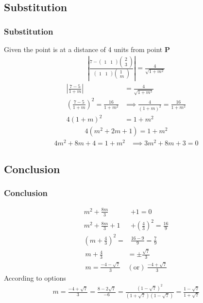 \documentclass{beamer}
\providecommand{\brak}[1]{\ensuremath{\left(#1\right)}}
\theoremstyle{remark}
\newcommand{\myvec}[1]{\ensuremath{\begin{pmatrix}#1\end{pmatrix}}}
\let\vec\mathbf
\numberwithin{equation}{section}
\begin{document}
\subsection{Substitution}
\begin{frame}
\frametitle{Substitution}
Given the point is at a distance of 4 units from point $\vec{P}$
\begin{align}
 \left|  \frac{7-\myvec{1&1}\myvec{2\\3}}{\myvec{1&1}\myvec{1\\m}} \right| =\frac{4}{\sqrt{1+m^2}} 
\end{align}
\begin{align}
\left|\frac{7-5}{1+m}\right|&=\frac{4}{\sqrt{1+m^2}} \\
\brak{\frac{7-5}{1+m}}^2=\frac{16}{1+m^2} &\implies \frac{4}{\brak{1+m}^2}=\frac{16}{1+m^2} \\
4\brak{1+m}^2&=1+m^2 
\end{align}
\begin{align}
4\brak{m^2+2m+1}=1+m^2 
\end{align}
\begin{align}
4m^2+8m+4=1+m^2 &\implies 3m^2 + 8m + 3 = 0 
\end{align}
\end{frame}
\subsection{Conclusion}
\begin{frame}
\frametitle{Conclusion}
\begin{align}
m^2 +\frac{8m}{3}& + 1 = 0 \\
m^2 +\frac{8m}{3} + 1 &+\brak{\frac{4}{3}}^2= \frac{16}{9} \\
\brak{m+\frac{4}{3}}^2=&\frac{16-9}{9}=\frac{7}{9} 
\end{align}
\begin{align}  
m+\frac{4}{3}&=\pm\frac{\sqrt{7}}{3} \\
m=\frac{-4-\sqrt{7}}{3}\ &\brak{\text{or}}\ \frac{-4+\sqrt{7}}{3}
\end{align}
According to options
\begin{align}
m=\frac{-4+\sqrt{7}}{3}=\frac{8-2\sqrt{7}}{-6}=\frac{\brak{1-\sqrt{7}}^2}{\brak{1+\sqrt{7}}\brak{1-\sqrt{7}}}=\frac{1-\sqrt{7}}{1+\sqrt{7}}
\end{align}
\end{frame}
\end{document}
